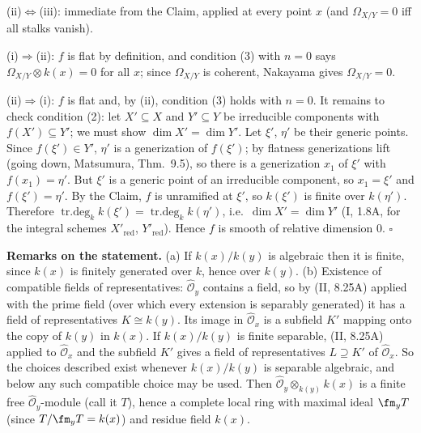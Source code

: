 \documentclass[11pt]{article}
\begin{document}
(ii)$\Leftrightarrow$(iii): immediate from the Claim, applied at every point $x$ (and $\Omega_{X/Y}=0$ iff all stalks vanish).

(i)$\Rightarrow$(ii): $f$ is flat by definition, and condition (3) with $n=0$ says $\Omega_{X/Y}\otimes k(x)=0$ for all $x$; since $\Omega_{X/Y}$ is coherent, Nakayama gives $\Omega_{X/Y}=0$.

(ii)$\Rightarrow$(i): $f$ is flat and, by (ii), condition (3) holds with $n=0$. It remains to check condition (2): let $X'\subseteq X$ and $Y'\subseteq Y$ be irreducible components with $f(X')\subseteq Y'$; we must show $\dim X'=\dim Y'$. Let $\xi'$, $\eta'$ be their generic points. Since $f(\xi')\in Y'$, $\eta'$ is a generization of $f(\xi')$; by flatness generizations lift (going down, Matsumura, Thm.~9.5), so there is a generization $x_1$ of $\xi'$ with $f(x_1)=\eta'$. But $\xi'$ is a generic point of an irreducible component, so $x_1=\xi'$ and $f(\xi')=\eta'$. By the Claim, $f$ is unramified at $\xi'$, so $k(\xi')$ is finite over $k(\eta')$. Therefore $\operatorname{tr.deg}_kk(\xi')=\operatorname{tr.deg}_kk(\eta')$, i.e.\ $\dim X'=\dim Y'$ (I, 1.8A, for the integral schemes $X'_{\mathrm{red}}$, $Y'_{\mathrm{red}}$). Hence $f$ is smooth of relative dimension $0$. \hfill$\square$

\pf
\textbf{Remarks on the statement.} (a) If $k(x)/k(y)$ is algebraic then it is finite, since $k(x)$ is finitely generated over $k$, hence over $k(y)$. (b) Existence of compatible fields of representatives: $\hat{\mathcal O}_y$ contains a field, so by (II, 8.25A) applied with the prime field (over which every extension is separably generated) it has a field of representatives $K\cong k(y)$. Its image in $\hat{\mathcal O}_x$ is a subfield $K'$ mapping onto the copy of $k(y)$ in $k(x)$. If $k(x)/k(y)$ is finite separable, (II, 8.25A) applied to $\hat{\mathcal O}_x$ and the subfield $K'$ gives a field of representatives $L\supseteq K'$ of $\hat{\mathcal O}_x$. So the choices described exist whenever $k(x)/k(y)$ is separable algebraic, and below any such compatible choice may be used. Then $\hat{\mathcal O}_y\otimes_{k(y)}k(x)$ is a finite free $\hat{\mathcal O}_y$-module (call it $T$), hence a complete local ring with maximal ideal $\fm_yT$ (since $T/\fm_yT=k(x)$) and residue field $k(x)$.
\end{document}

